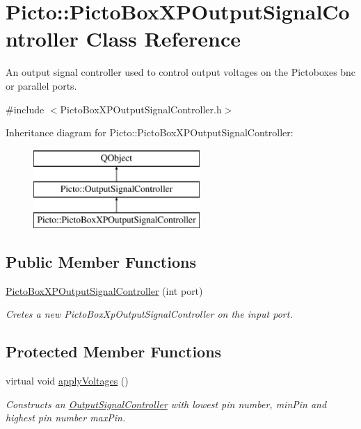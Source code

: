 \hypertarget{class_picto_1_1_picto_box_x_p_output_signal_controller}{\section{Picto\-:\-:Picto\-Box\-X\-P\-Output\-Signal\-Controller Class Reference}
\label{class_picto_1_1_picto_box_x_p_output_signal_controller}
}


An output signal controller used to control output voltages on the Pictoboxes bnc or parallel ports.  




{\ttfamily \#include $<$Picto\-Box\-X\-P\-Output\-Signal\-Controller.\-h$>$}

Inheritance diagram for Picto\-:\-:Picto\-Box\-X\-P\-Output\-Signal\-Controller\-:\begin{figure}[H]
\begin{center}
\leavevmode
\includegraphics[height=3.000000cm]{class_picto_1_1_picto_box_x_p_output_signal_controller}
\end{center}
\end{figure}
\subsection*{Public Member Functions}
\begin{DoxyCompactItemize}
\item 
\hyperlink{class_picto_1_1_picto_box_x_p_output_signal_controller_a7a35ef92cc118befda4cc652c4001556}{Picto\-Box\-X\-P\-Output\-Signal\-Controller} (int port)
\begin{DoxyCompactList}\small\item\em Cretes a new Picto\-Box\-Xp\-Output\-Signal\-Controller on the input port. \end{DoxyCompactList}\end{DoxyCompactItemize}
\subsection*{Protected Member Functions}
\begin{DoxyCompactItemize}
\item 
virtual void \hyperlink{class_picto_1_1_picto_box_x_p_output_signal_controller_a87d9847d8563598a0c5306aaac28040f}{apply\-Voltages} ()
\begin{DoxyCompactList}\small\item\em Constructs an \hyperlink{class_picto_1_1_output_signal_controller}{Output\-Signal\-Controller} with lowest pin number, min\-Pin and highest pin number max\-Pin. \end{DoxyCompactList}\end{DoxyCompactItemize}

